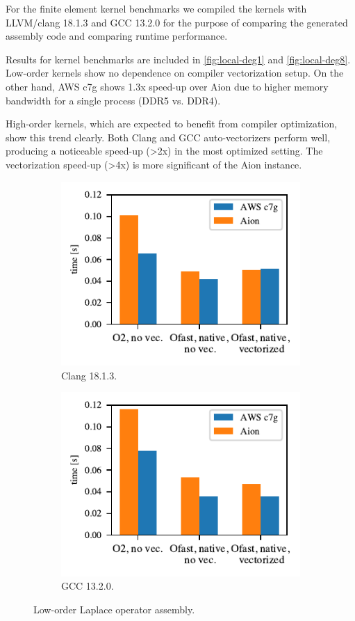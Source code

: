 For the finite element kernel benchmarks we compiled the kernels with
LLVM/clang 18.1.3 and GCC 13.2.0 for the purpose of comparing the generated
assembly code and comparing runtime performance.

Results for kernel benchmarks are included in \autoref{fig:local-deg1} and
\autoref{fig:local-deg8}. Low-order kernels show no dependence on compiler
vectorization setup. On the other hand, AWS c7g shows 1.3x speed-up over
Aion due to higher memory bandwidth for a single process (DDR5 vs. DDR4).

High-order kernels, which are expected to benefit from compiler optimization,
show this trend clearly. Both Clang and GCC auto-vectorizers perform well,
producing a noticeable speed-up (\textgreater 2x) in the most optimized setting. The
vectorization speed-up (\textgreater 4x) is more significant of the Aion instance.

\begin{figure}
    \begin{subfigure}{.5\textwidth}
        \centering
        \includegraphics{chapters/chp1/graphics/kernel_plots/local_operator_clang_deg1.pdf}
        \caption{Clang 18.1.3.}
        \label{fig:local-clang-deg1}
    \end{subfigure}%
    \begin{subfigure}{.5\textwidth}
        \centering
        \includegraphics{chapters/chp1/graphics/kernel_plots/local_operator_gcc_deg1.pdf}
        \caption{GCC 13.2.0.}
        \label{fig:local-gcc-deg1}
    \end{subfigure}
    \caption{Low-order Laplace operator assembly.}
    \label{fig:local-deg1}
\end{figure}


